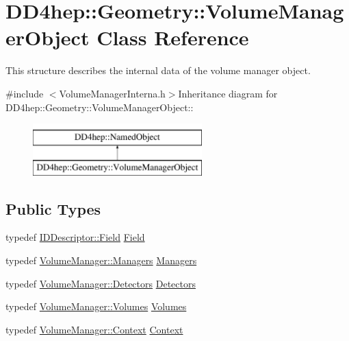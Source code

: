 \hypertarget{class_d_d4hep_1_1_geometry_1_1_volume_manager_object}{
\section{DD4hep::Geometry::VolumeManagerObject Class Reference}
\label{class_d_d4hep_1_1_geometry_1_1_volume_manager_object}
}


This structure describes the internal data of the volume manager object.  


{\ttfamily \#include $<$VolumeManagerInterna.h$>$}Inheritance diagram for DD4hep::Geometry::VolumeManagerObject::\begin{figure}[H]
\begin{center}
\leavevmode
\includegraphics[height=2cm]{class_d_d4hep_1_1_geometry_1_1_volume_manager_object}
\end{center}
\end{figure}
\subsection*{Public Types}
\begin{DoxyCompactItemize}
\item 
typedef \hyperlink{class_d_d4hep_1_1_geometry_1_1_i_d_descriptor_ac06f5915e74f8a8f2ff73e9a322556e4}{IDDescriptor::Field} \hyperlink{class_d_d4hep_1_1_geometry_1_1_volume_manager_object_ab214e2fe7df311a4a2e87ec17958790c}{Field}
\item 
typedef \hyperlink{class_d_d4hep_1_1_geometry_1_1_volume_manager_ad60f5618f569c6604861b6e0eb1c71c9}{VolumeManager::Managers} \hyperlink{class_d_d4hep_1_1_geometry_1_1_volume_manager_object_ad98004850761b06cd3a81c68cdcc0087}{Managers}
\item 
typedef \hyperlink{class_d_d4hep_1_1_geometry_1_1_volume_manager_a89d31fb00522aa56dfa2708fedaf1e4f}{VolumeManager::Detectors} \hyperlink{class_d_d4hep_1_1_geometry_1_1_volume_manager_object_a3148ed79d5f6e5175060519838dbad38}{Detectors}
\item 
typedef \hyperlink{class_d_d4hep_1_1_geometry_1_1_volume_manager_a81625fd63b37636f0b4019b102aba787}{VolumeManager::Volumes} \hyperlink{class_d_d4hep_1_1_geometry_1_1_volume_manager_object_a6bbeb958237bc33c7228abada088f6a1}{Volumes}
\item 
typedef \hyperlink{class_d_d4hep_1_1_geometry_1_1_volume_manager_context}{VolumeManager::Context} \hyperlink{class_d_d4hep_1_1_geometry_1_1_volume_manager_object_ac975f498c99a0933b0b5911d4fb721b3}{Context}
\end{DoxyCompactItemize}
